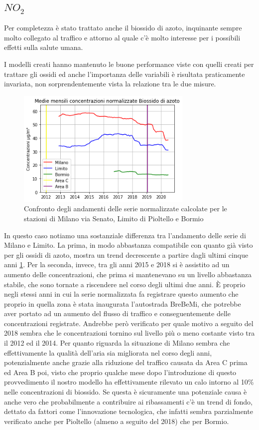 \documentclass[a4paper]{report}
\begin{document}
\subsection{$NO_2$}
Per completezza è stato trattato anche il biossido di azoto, inquinante sempre molto collegato al traffico e attorno al quale c'è molto interesse per i possibili effetti sulla salute umana.

I modelli creati hanno mantenuto le buone performance viste con quelli creati per trattare gli ossidi ed anche l'importanza delle variabili è risultata praticamente invariata, non sorprendentemente vista la relazione tra le due misure.

\begin{figure}[h]
\centering
\includegraphics[width=0.75\textwidth]{no2_traffico}
\caption{Confronto degli andamenti delle serie normalizzate calcolate per le stazioni di Milano via Senato, Limito di Pioltello e Bormio}
\label{fig:no2_traffico}
\end{figure}

In questo caso notiamo una sostanziale differenza tra l'andamento delle serie di Milano e Limito. La prima, in modo abbastanza compatibile con quanto già visto per gli ossidi di azoto, mostra un trend decrescente a partire dagli ultimi cinque anni \ref{fig:no2_traffico}. Per la seconda, invece, tra gli anni 2015 e 2018 si è assistito ad un aumento delle concentrazioni, che prima si mantenevano su un livello abbastanza stabile, che sono tornate a riscendere nel corso degli ultimi due anni. È proprio negli stessi anni in cui la serie normalizzata fa registrare questo aumento che proprio in quella zona è stata inaugurata l'autostrada BreBeMi, che potrebbe aver portato ad un aumento del flusso di traffico e conseguentemente delle concentrazioni registrate. Andrebbe però verificato per quale motivo a seguito del 2018 sembra che le concentrazioni tornino sul livello più o meno costante visto tra il 2012 ed il 2014.
Per quanto riguarda la situazione di Milano sembra che effettivamente la qualità dell'aria sia migliorata nel corso degli anni, potenzialmente anche grazie alla riduzione del traffico causata da Area C prima ed Area B poi, visto che proprio qualche mese dopo l'introduzione di questo provvedimento il nostro modello ha effettivamente rilevato un calo intorno al 10\% nelle concentrazioni di biossido. Se questa è sicuramente una potenziale causa è anche vero che probabilmente a contribuire ai ribassamenti c'è un trend di fondo, dettato da fattori come l'innovazione tecnologica, che infatti sembra parzialmente verificato anche per Pioltello (almeno a seguito del 2018) che per Bormio.
\end{document}
